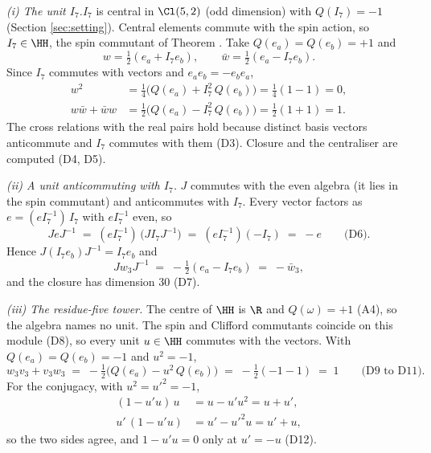 \textit{(i) The unit $I_{7}$.}\enspace $I_{7}$ is central in $\Cl(5,2)$ (odd dimension) with $Q(I_{7}) = -1$ (Section \ref{sec:setting}). Central elements commute with the spin action, so $I_{7} \in \HH$, the spin commutant of Theorem . Take $Q(e_{a}) = Q(e_{b}) = +1$ and
\[
w = \tfrac{1}{2}(e_{a} + I_{7}e_{b}), \qquad \bar{w} = \tfrac{1}{2}(e_{a} - I_{7}e_{b}).
\]
Since $I_{7}$ commutes with vectors and $e_{a}e_{b} = -e_{b}e_{a}$,
\begin{align*}
w^{2} &= \tfrac{1}{4}\bigl(Q(e_{a}) + I_{7}^{2}\,Q(e_{b})\bigr) = \tfrac{1}{4}(1 - 1) = 0, \\
w\bar{w} + \bar{w}w &= \tfrac{1}{2}\bigl(Q(e_{a}) - I_{7}^{2}\,Q(e_{b})\bigr) = \tfrac{1}{2}(1 + 1) = 1.
\end{align*}
The cross relations with the real pairs hold because distinct basis vectors anticommute and $I_{7}$ commutes with them (D3). Closure and the centraliser are computed (D4, D5).



\emph{(ii) A unit anticommuting with $I_{7}$.}  $J$ commutes with the even algebra (it lies in the spin commutant) and anticommutes with $I_{7}$. Every vector factors as $e = (eI_{7}^{-1})\,I_{7}$ with $eI_{7}^{-1}$ even, so
\[
JeJ^{-1} \;=\; (eI_{7}^{-1})\,\bigl(JI_{7}J^{-1}\bigr) \;=\; (eI_{7}^{-1})(-I_{7}) \;=\; -e \qquad \text{(D6)}.
\]
Hence $J(I_{7}e_{b})J^{-1} = I_{7}e_{b}$ and
\[
Jw_{3}J^{-1} \;=\; -\tfrac{1}{2}(e_{a} - I_{7}e_{b}) \;=\; -\bar{w}_{3},
\]
and the closure has dimension $30$ (D7).



\emph{(iii) The residue-five tower.}  The centre of $\HH$ is $\R$ and $Q(\omega) = +1$ (A4), so the algebra names no unit. The spin and Clifford commutants coincide on this module (D8), so every unit $u \in \HH$ commutes with the vectors. With $Q(e_{a}) = Q(e_{b}) = -1$ and $u^{2} = -1$,
\[
w_{3}v_{3} + v_{3}w_{3} \;=\; -\tfrac{1}{2}\bigl(Q(e_{a}) - u^{2}\,Q(e_{b})\bigr) \;=\; -\tfrac{1}{2}(-1 - 1) \;=\; 1 \qquad \text{(D9 to D11)}.
\]
For the conjugacy, with $u^{2} = u'^{2} = -1$,
\begin{align*}
(1 - u'u)\,u &= u - u'u^{2} = u + u', \\
u'\,(1 - u'u) &= u' - u'^{2}u = u' + u,
\end{align*}
so the two sides agree, and $1 - u'u = 0$ only at $u' = -u$ (D12).
